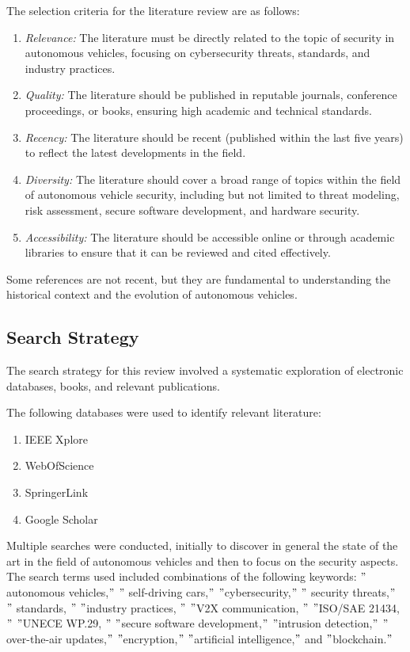 The selection criteria for the literature review are as follows:
\begin{enumerate}
    \item \textit{Relevance:} The literature must be directly related to the topic of security in autonomous vehicles, focusing on cybersecurity threats, standards, and industry practices.
    \item \textit{Quality:} The literature should be published in reputable journals, conference proceedings, or books, ensuring high academic and technical standards.
    \item \textit{Recency:} The literature should be recent (published within the last five years) to reflect the latest developments in the field.
    \item \textit{Diversity:} The literature should cover a broad range of topics within the field of autonomous vehicle security, including but not limited to threat modeling, risk assessment, secure software development, and hardware security.
    \item \textit{Accessibility:} The literature should be accessible online or through academic libraries to ensure that it can be reviewed and cited effectively.
\end{enumerate}

Some references are not recent, but they are fundamental to understanding the historical context and the evolution of autonomous vehicles.

\subsection{Search Strategy}\label{subsec:search-strategy}

The search strategy for this review involved a systematic exploration of electronic databases, books, and relevant publications.

The following databases were used to identify relevant literature:

\begin{enumerate}
    \item IEEE Xplore
    \item WebOfScience
    \item SpringerLink
    \item Google Scholar
\end{enumerate}

Multiple searches were conducted, initially to discover in general the state of the art in the field of autonomous vehicles and then to focus on the security aspects.
The search terms used included combinations of the following keywords:
\("\)autonomous vehicles,\("\) \("\) self-driving cars,\("\) \("\)cybersecurity,\("\) \("\) security threats,\("\) \("\) standards, \("\) \("\)industry practices, \("\) \("\)V2X communication, \("\) \("\)ISO/SAE 21434, \("\) \("\)UNECE WP.29, \("\) \("\)secure software development,\("\) \("\)intrusion detection,\("\) \("\)over-the-air updates,\("\) \("\)encryption,\("\) \("\)artificial intelligence,\("\) and \("\)blockchain.\("\)

